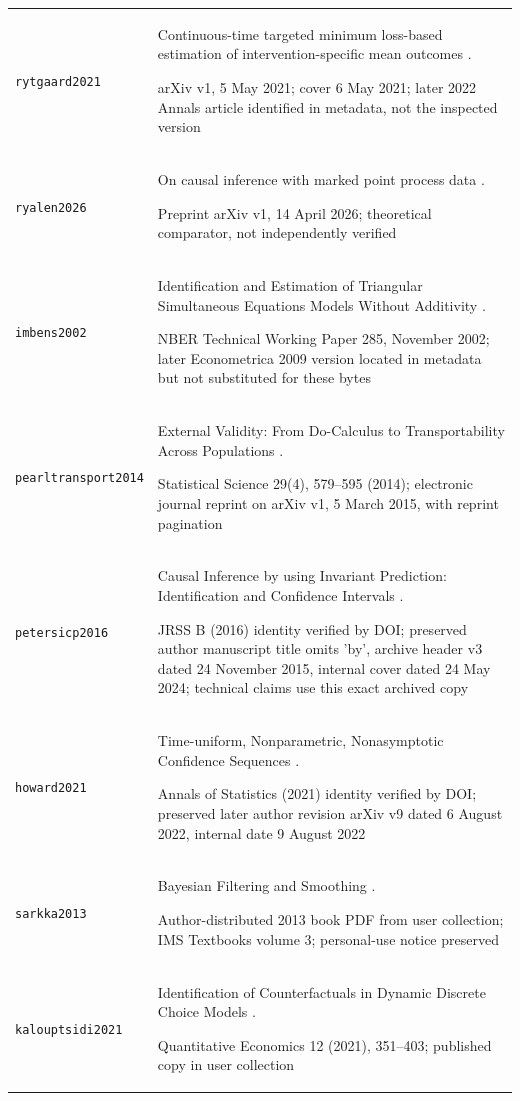 \begin{longtable}{P{32mm}P{112mm}}
{\scriptsize\texttt{rytgaard2021}} & Continuous-time targeted minimum loss-based estimation of intervention-specific mean outcomes \citep{rytgaard2021}.\par arXiv v1, 5 May 2021; cover 6 May 2021; later 2022 Annals article identified in metadata, not the inspected version\\
{\scriptsize\texttt{ryalen2026}} & On causal inference with marked point process data \citep{ryalen2026}.\par Preprint arXiv v1, 14 April 2026; theoretical comparator, not independently verified\\
{\scriptsize\texttt{imbens2002}} & Identification and Estimation of Triangular Simultaneous Equations Models Without Additivity \citep{imbens2002}.\par NBER Technical Working Paper 285, November 2002; later Econometrica 2009 version located in metadata but not substituted for these bytes\\
{\scriptsize\texttt{pearltransport2014}} & External Validity: From Do-Calculus to Transportability Across Populations \citep{pearltransport2014}.\par Statistical Science 29(4), 579--595 (2014); electronic journal reprint on arXiv v1, 5 March 2015, with reprint pagination\\
{\scriptsize\texttt{petersicp2016}} & Causal Inference by using Invariant Prediction: Identification and Confidence Intervals \citep{petersicp2016}.\par JRSS B (2016) identity verified by DOI; preserved author manuscript title omits 'by', archive header v3 dated 24 November 2015, internal cover dated 24 May 2024; technical claims use this exact archived copy\\
{\scriptsize\texttt{howard2021}} & Time-uniform, Nonparametric, Nonasymptotic Confidence Sequences \citep{howard2021}.\par Annals of Statistics (2021) identity verified by DOI; preserved later author revision arXiv v9 dated 6 August 2022, internal date 9 August 2022\\
{\scriptsize\texttt{sarkka2013}} & Bayesian Filtering and Smoothing \citep{sarkka2013}.\par Author-distributed 2013 book PDF from user collection; IMS Textbooks volume 3; personal-use notice preserved\\
{\scriptsize\texttt{kalouptsidi2021}} & Identification of Counterfactuals in Dynamic Discrete Choice Models \citep{kalouptsidi2021}.\par Quantitative Economics 12 (2021), 351--403; published copy in user collection\\

\end{longtable}
